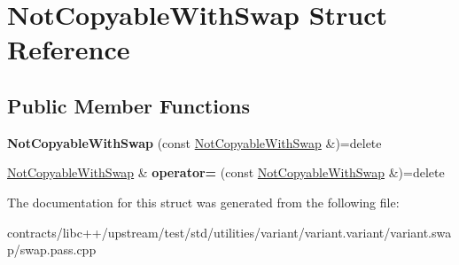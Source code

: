 \hypertarget{struct_not_copyable_with_swap}{}\section{Not\+Copyable\+With\+Swap Struct Reference}
\label{struct_not_copyable_with_swap}
\subsection*{Public Member Functions}
\begin{DoxyCompactItemize}
\item 
\mbox{\label{struct_not_copyable_with_swap_acb661f7968a933cde75cec214810bfa1}} 
{\bfseries Not\+Copyable\+With\+Swap} (const \mbox{\hyperlink{struct_not_copyable_with_swap}{Not\+Copyable\+With\+Swap}} \&)=delete
\item 
\mbox{\label{struct_not_copyable_with_swap_aff20331c7cce22ee8755f5eb55febd3f}} 
\mbox{\hyperlink{struct_not_copyable_with_swap}{Not\+Copyable\+With\+Swap}} \& {\bfseries operator=} (const \mbox{\hyperlink{struct_not_copyable_with_swap}{Not\+Copyable\+With\+Swap}} \&)=delete
\end{DoxyCompactItemize}


The documentation for this struct was generated from the following file\+:\begin{DoxyCompactItemize}
\item 
contracts/libc++/upstream/test/std/utilities/variant/variant.\+variant/variant.\+swap/swap.\+pass.\+cpp\end{DoxyCompactItemize}

